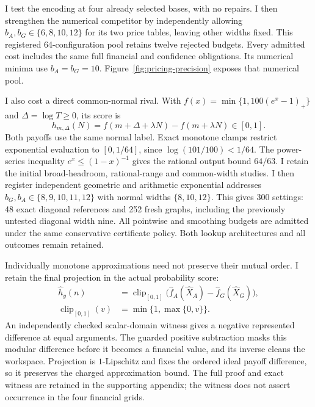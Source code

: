 \documentclass[11pt]{article}
\begin{document}
I test the encoding at four already selected bases, with no repairs.
I then strengthen the numerical competitor by independently allowing
$b_A,b_G\in\{6,8,10,12\}$ for its two price tables, leaving other widths
fixed. This registered 64-configuration pool retains twelve rejected
budgets. Every admitted cost includes the same full financial and
confidence obligations. Its numerical minima use $b_A=b_G=10$.
Figure~\ref{fig:pricing-precision} exposes that numerical pool.

I also cost a direct common-normal rival. With
$f(x)=\min\{1,100(e^x-1)_+\}$ and $\Delta=\log T\geq0$, its score is
\begin{equation}
h_{m,\Delta}(N)=f(m+\Delta+\lambda N)-f(m+\lambda N)\in[0,1].
\end{equation}
Both payoffs use the same normal label. Exact monotone clamps restrict
exponential evaluation to $[0,1/64]$, since
$\log(101/100)<1/64$. The power-series inequality
$e^x\leq(1-x)^{-1}$ gives the rational output bound $64/63$.
I retain the initial broad-headroom, rational-range and common-width
studies. I then register independent geometric and arithmetic exponential
addresses $b_G,b_A\in\{8,9,10,11,12\}$ with normal widths
$\{8,10,12\}$. This gives 300 settings: 48 exact diagonal references and
252 fresh graphs, including the previously untested diagonal width nine.
All pointwise and smoothing budgets are admitted under the same conservative
certificate policy. Both lookup architectures and all outcomes remain retained.

Individually monotone approximations need not preserve their mutual order.
I retain the final projection in the actual probability score:
\begin{equation}
\begin{aligned}
\widehat h_y(n)&=\operatorname{clip}_{[0,1]}
 \bigl(\widehat f_A(\widehat X_A)-\widehat f_G(\widehat X_G)\bigr),\\
\operatorname{clip}_{[0,1]}(v)&=\min\{1,\max\{0,v\}\}.
\end{aligned}
\label{eq:projected-raw-score}
\end{equation}
An independently checked scalar-domain witness gives a negative represented
difference at equal arguments. The guarded positive subtraction masks this
modular difference before it becomes a financial value, and its inverse
cleans the workspace. Projection is $1$-Lipschitz and fixes the ordered
ideal payoff difference, so it preserves the charged approximation bound.
The full proof and exact witness are retained in the supporting appendix;
the witness does not assert occurrence in the four financial grids.
\end{document}
